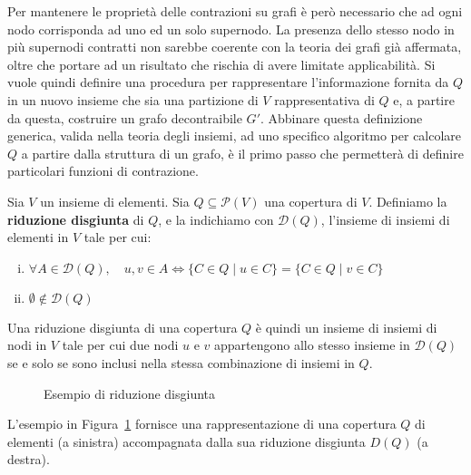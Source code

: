 Per mantenere le proprietà delle contrazioni su grafi è però necessario che ad ogni nodo corrisponda ad uno ed un solo
supernodo.
La presenza dello stesso nodo in più supernodi contratti non sarebbe coerente con la teoria dei grafi
già affermata, oltre che portare ad un risultato che rischia di avere limitate applicabilità.
Si vuole quindi definire una procedura per rappresentare l'informazione fornita da $Q$ in un nuovo insieme che sia una
partizione di $V$ rappresentativa di $Q$ e, a partire da questa, costruire un grafo decontraibile $G'$.
Abbinare questa definizione generica, valida nella teoria degli insiemi, ad uno specifico algoritmo per calcolare
$Q$ a partire dalla struttura di un grafo, è il primo passo che permetterà di definire particolari funzioni di
contrazione.


\begin{definition}
Sia $V$ un insieme di elementi. Sia $Q \subseteq \mathcal{P}(V)$ una copertura di $V$.
Definiamo la \textbf{riduzione disgiunta} di $Q$, e la indichiamo con $\mathcal{D}(Q)$,
l'insieme di insiemi di elementi in $V$ tale per cui:
\begin{enumerate}[(i)]
    \item $\forall A \in \mathcal{D}(Q), \quad u, v \in A \Leftrightarrow \{C \in Q \mid u \in C\} = \{C \in Q \mid v \in C\}$
    \item $\emptyset \notin \mathcal{D}(Q)$
\end{enumerate}
\end{definition}

Una riduzione disgiunta di una copertura $Q$ è quindi un insieme di insiemi di nodi in $V$ tale per cui due
nodi $u$ e $v$ appartengono allo stesso insieme in $\mathcal{D}(Q)$ se e solo se sono inclusi nella stessa combinazione
di insiemi in $Q$.

\begin{figure}[!h] \centering

\caption{Esempio di riduzione disgiunta}
\label{fig:disjoint_reduction_example}
\end{figure}

L'esempio in Figura~\ref{fig:disjoint_reduction_example} fornisce una rappresentazione di una copertura $Q$ di
elementi (a sinistra) accompagnata dalla sua riduzione disgiunta $D(Q)$ (a destra). \newline

